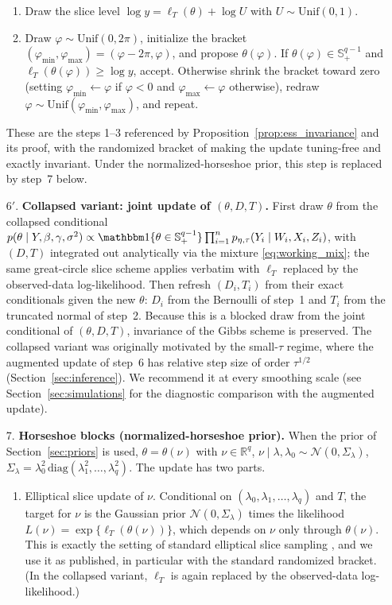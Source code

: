 \documentclass[11pt]{article}
\theoremstyle{definition}
\theoremstyle{plain}
\newcommand{\R}{\mathbb{R}}
\begin{document}
\begin{enumerate}[leftmargin=*,nosep]
\begin{enumerate}[label=\textup{(\arabic*)},nosep,leftmargin=2.2em]
\item Draw the slice level $\log y=\ell_T(\theta)+\log U$ with $U\sim\mathrm{Unif}(0,1)$.
\item Draw $\varphi\sim\mathrm{Unif}(0,2\pi)$, initialize the bracket $(\varphi_{\min},\varphi_{\max})=(\varphi-2\pi,\varphi)$, and propose $\theta(\varphi)$. If $\theta(\varphi)\in\mathbb S^{q-1}_+$ and $\ell_T(\theta(\varphi))\ge\log y$, accept. Otherwise shrink the bracket toward zero (setting $\varphi_{\min}\leftarrow\varphi$ if $\varphi<0$ and $\varphi_{\max}\leftarrow\varphi$ otherwise), redraw $\varphi\sim\mathrm{Unif}(\varphi_{\min},\varphi_{\max})$, and repeat.
\end{enumerate}
These are the steps 1--3 referenced by Proposition~\ref{prop:ess_invariance} and its proof, with the randomized bracket of \citet{Murray2010} making the update tuning-free and exactly invariant. Under the normalized-horseshoe prior, this step is replaced by step~7 below.
\item[6$'$.] \textbf{Collapsed variant: joint update of $(\theta,D,T)$.}
First draw $\theta$ from the collapsed conditional
$p(\theta\mid Y,\beta,\gamma,\sigma^2)\propto\mathbbm 1\{\theta\in\mathbb S^{q-1}_+\}\prod_{i=1}^n p_{\eta,\tau}(Y_i\mid W_i,X_i,Z_i)$,
with $(D,T)$ integrated out analytically via the mixture \eqref{eq:working_mix}; the same great-circle slice scheme applies verbatim with $\ell_T$ replaced by the observed-data log-likelihood. Then refresh $(D_i,T_i)$ from their exact conditionals given the new $\theta$: $D_i$ from the Bernoulli of step~1 and $T_i$ from the truncated normal of step~2. Because this is a blocked draw from the joint conditional of $(\theta,D,T)$, invariance of the Gibbs scheme is preserved. The collapsed variant was originally motivated by the small-$\tau$ regime, where the augmented update of step~6 has relative step size of order $\tau^{1/2}$ (Section~\ref{sec:inference}). We recommend it at every smoothing scale (see Section~\ref{sec:simulations} for the diagnostic comparison with the augmented update).
\item[7.] \textbf{Horseshoe blocks (normalized-horseshoe prior).}
When the prior of Section~\ref{sec:priors} is used, $\theta=\theta(\nu)$ with $\nu\in\R^q$, $\nu\mid\lambda,\lambda_0\sim\mathcal N(0,\Sigma_\lambda)$, $\Sigma_\lambda=\lambda_0^2\,\mathrm{diag}(\lambda_1^2,\dots,\lambda_q^2)$. The update has two parts.
\begin{enumerate}[label=(\alph*),nosep]
\item Elliptical slice update of $\nu$. Conditional on $(\lambda_0,\lambda_1,\dots,\lambda_q)$ and $T$, the target for $\nu$ is the Gaussian prior $\mathcal N(0,\Sigma_\lambda)$ times the likelihood $L(\nu)=\exp\{\ell_T(\theta(\nu))\}$, which depends on $\nu$ only through $\theta(\nu)$. This is exactly the setting of standard elliptical slice sampling \citep{Murray2010}, and we use it as published, in particular with the standard randomized bracket. (In the collapsed variant, $\ell_T$ is again replaced by the observed-data log-likelihood.)

\end{enumerate}
\end{enumerate}
\end{document}
